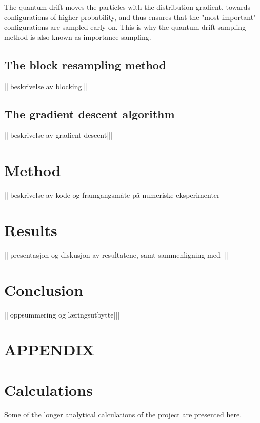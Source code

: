 \documentclass[a4paper,8pt]{article}
\begin{document}
\begin{multicols}{2}
The quantum drift moves the particles with the distribution gradient, towards configurations of higher probability, and thus ensures that the "most important" configurations are sampled early on. This is why the quantum drift sampling method is also known as importance sampling.

\subsection{The block resampling method}
|||beskrivelse av blocking|||

\subsection{The gradient descent algorithm}
|||beskrivelse av gradient descent|||

\section{Method} \label{method}

|||beskrivelse av kode og framgangsmåte på numeriske eksperimenter||


\section{Results} \label{results}

|||presentasjon og diskusjon av resultatene, samt sammenligning med \cite{SWL}|||


\section{Conclusion}

|||oppsummering og læringsutbytte|||


\end{multicols}




\newpage
\appendix
\setcounter{equation}{0}
\renewcommand{\theequation}{\thesection\arabic{equation}}
\section*{APPENDIX}
\section{Calculations}

Some of the longer analytical calculations of the project are presented here.
\end{document}
